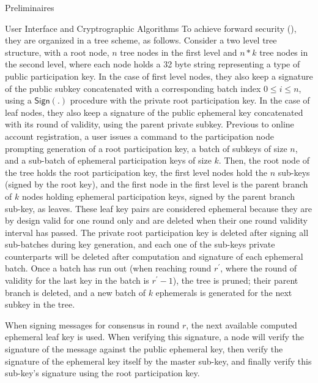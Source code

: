 \documentclass[10pt,a4paper]{article}
\begin{document}
\begin{section}{Preliminaires}
\begin{subsection}{User Interface and Cryptrographic Algorithms}
    To achieve forward security (\cite{Gunther:1990}), they are organized in a tree scheme, as follows.
    Consider a two level tree structure, with a root node, 
      $n$ tree nodes in the first level and 
      $n*k$ tree nodes in the second level, 
      where each node holds a 32 byte string representing a type of public participation key. 
    In the case of first level nodes, they also keep a signature of the public subkey concatenated with 
      a corresponding batch index $0 \leq i \leq n$,
      using a $\mathsf{Sign}(.)$ procedure with the private root participation key.
    In the case of leaf nodes, they also keep a signature of the public ephemeral key concatenated 
      with its round of validity, using the parent private subkey.
    Previous to online account registration, a user issues a command to the participation node prompting 
      generation of a root participation key, a batch of subkeys of size $n$, and a sub-batch of ephemeral 
      participation keys of size $k$.
    Then, the root node of the tree holds the root participation key, the first level nodes hold the $n$ sub-keys
      (signed by the root key), and the first node in the first level is the parent branch of $k$ nodes holding
      ephemeral participation keys, signed by the parent branch sub-key, as leaves.
    These leaf key pairs are considered ephemeral because they are by design valid for one round only and are 
      deleted when their one round validity interval has passed.
    The private root participation key is deleted after signing all sub-batches during key generation,
      and each one of the sub-keys private counterparts will be deleted after computation and signature of 
      each ephemeral batch.
    Once a batch has run out (when reaching round $r^\prime$, where the round of validity for the last key in 
      the batch is $r^\prime - 1$), the tree is pruned; their parent branch is deleted, and a new batch of $k$
      ephemerals is generated for the next subkey in the tree.
    
    When signing messages for consensus in round $r$, the next available computed ephemeral leaf key is used.
    When verifying this signature, a node will verify the signature of the message against the public ephemeral key, 
    then verify the signature of the ephemeral key itself by the master sub-key, and finally verify this sub-key's
    signature using the root participation key.


\end{subsection}
\end{section}
\end{document}

